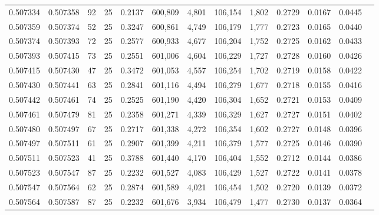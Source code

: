 \begin{tabular}{rrrrrrrrrrrrr}
0.507334 & 0.507358 &  92 &  25 &                                     0.2137 & 600,809 &   4,801 & 106,154 &   1,802 & 0.2729 & 0.0167 & 0.0445 \\
0.507359 & 0.507374 &  52 &  25 &                                     0.3247 & 600,861 &   4,749 & 106,179 &   1,777 & 0.2723 & 0.0165 & 0.0440 \\
0.507374 & 0.507393 &  72 &  25 &                                     0.2577 & 600,933 &   4,677 & 106,204 &   1,752 & 0.2725 & 0.0162 & 0.0433 \\
0.507393 & 0.507415 &  73 &  25 &                                     0.2551 & 601,006 &   4,604 & 106,229 &   1,727 & 0.2728 & 0.0160 & 0.0426 \\
0.507415 & 0.507430 &  47 &  25 &                                     0.3472 & 601,053 &   4,557 & 106,254 &   1,702 & 0.2719 & 0.0158 & 0.0422 \\
0.507430 & 0.507441 &  63 &  25 &                                     0.2841 & 601,116 &   4,494 & 106,279 &   1,677 & 0.2718 & 0.0155 & 0.0416 \\
0.507442 & 0.507461 &  74 &  25 &                                     0.2525 & 601,190 &   4,420 & 106,304 &   1,652 & 0.2721 & 0.0153 & 0.0409 \\
0.507461 & 0.507479 &  81 &  25 &                                     0.2358 & 601,271 &   4,339 & 106,329 &   1,627 & 0.2727 & 0.0151 & 0.0402 \\
0.507480 & 0.507497 &  67 &  25 &                                     0.2717 & 601,338 &   4,272 & 106,354 &   1,602 & 0.2727 & 0.0148 & 0.0396 \\
0.507497 & 0.507511 &  61 &  25 &                                     0.2907 & 601,399 &   4,211 & 106,379 &   1,577 & 0.2725 & 0.0146 & 0.0390 \\
0.507511 & 0.507523 &  41 &  25 &                                     0.3788 & 601,440 &   4,170 & 106,404 &   1,552 & 0.2712 & 0.0144 & 0.0386 \\
0.507523 & 0.507547 &  87 &  25 &                                     0.2232 & 601,527 &   4,083 & 106,429 &   1,527 & 0.2722 & 0.0141 & 0.0378 \\
0.507547 & 0.507564 &  62 &  25 &                                     0.2874 & 601,589 &   4,021 & 106,454 &   1,502 & 0.2720 & 0.0139 & 0.0372 \\
0.507564 & 0.507587 &  87 &  25 &                                     0.2232 & 601,676 &   3,934 & 106,479 &   1,477 & 0.2730 & 0.0137 & 0.0364 \\

\end{tabular}
